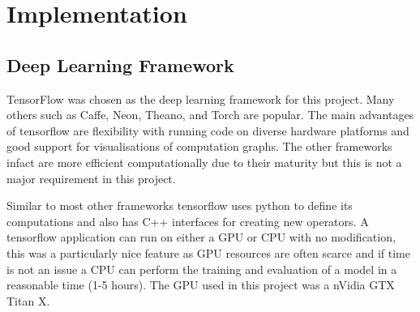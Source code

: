 \chapter{Implementation}
  \section{Deep Learning Framework}
    TensorFlow \cite{tensorflow} was chosen as the deep learning framework for this
    project. Many others such as Caffe, Neon, Theano, and Torch are popular\cite{Bahrampour2016}.
    The main advantages of tensorflow are flexibility with running code on diverse
    hardware platforms and good support for visualisations
    of computation graphs. The other frameworks infact are more efficient computationally due to their maturity\cite{Bahrampour2016}
    but this is not a major requirement in this project.


    Similar to most other frameworks tensorflow uses python
    to define its computations and also has C++ interfaces for creating new operators.
    A tensorflow application can run on either a GPU or CPU with no modification, this was
    a particularly nice feature as GPU resources are often scarce and if time is not an issue a CPU
    can perform the training and evaluation of a model in a reasonable time (1-5 hours). The GPU used in this project was a nVidia GTX Titan X.
